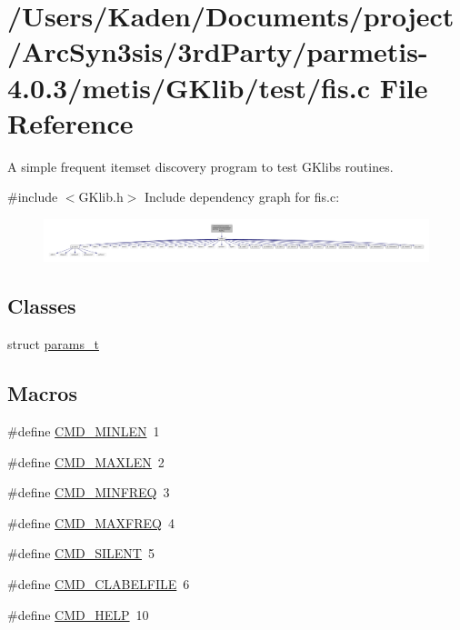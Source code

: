 \hypertarget{a00146}{}\section{/\+Users/\+Kaden/\+Documents/project/\+Arc\+Syn3sis/3rd\+Party/parmetis-\/4.0.3/metis/\+G\+Klib/test/fis.c File Reference}
\label{a00146}


A simple frequent itemset discovery program to test G\+Klib\textquotesingle{}s routines.  


{\ttfamily \#include $<$G\+Klib.\+h$>$}\newline
Include dependency graph for fis.\+c\+:\nopagebreak
\begin{figure}[H]
\begin{center}
\leavevmode
\includegraphics[width=350pt]{a00147}
\end{center}
\end{figure}
\subsection*{Classes}
\begin{DoxyCompactItemize}
\item 
struct \hyperlink{a00706}{params\+\_\+t}
\end{DoxyCompactItemize}
\subsection*{Macros}
\begin{DoxyCompactItemize}
\item 
\#define \hyperlink{a00146_aacf04ecfd59a1c65ac2d0837c6797418}{C\+M\+D\+\_\+\+M\+I\+N\+L\+EN}~1
\item 
\#define \hyperlink{a00146_a07a54a5f6fc8e52b89e9c2e0244d4cc1}{C\+M\+D\+\_\+\+M\+A\+X\+L\+EN}~2
\item 
\#define \hyperlink{a00146_a08e5c69995fd8e73505890ac8e4949cc}{C\+M\+D\+\_\+\+M\+I\+N\+F\+R\+EQ}~3
\item 
\#define \hyperlink{a00146_a034dfcbea3f5be5b2c6922b2c95caedb}{C\+M\+D\+\_\+\+M\+A\+X\+F\+R\+EQ}~4
\item 
\#define \hyperlink{a00146_a2e65376b8a4d8bfb10fed749904bbfa2}{C\+M\+D\+\_\+\+S\+I\+L\+E\+NT}~5
\item 
\#define \hyperlink{a00146_a431c4dd9dfee6eda132e882f0d19bdc7}{C\+M\+D\+\_\+\+C\+L\+A\+B\+E\+L\+F\+I\+LE}~6
\item 
\#define \hyperlink{a00146_a42553adbbb23a03ca876697c00ea44b1}{C\+M\+D\+\_\+\+H\+E\+LP}~10
\end{DoxyCompactItemize}
